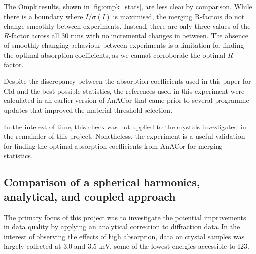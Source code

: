The Ompk results, shown in \cref{fig:ompk_stats}, are less clear by comparison. While there is a boundary where $I/\sigma(I)$ is maximised, the merging R-factors do not change smoothly between experiments. Instead, there are only three values of the $R$-factor across all 30 runs with no incremental changes in between. %
The absence of smoothly-changing behaviour between experiments is a limitation for finding the optimal absorption coefficients, as we cannot corroborate the optimal $R$ factor.%




Despite the discrepancy between the absorption coefficients used in this paper for Cld and the best possible statistics, the references used in this experiment were calculated in an earlier version of AnACor that came prior to several programme updates that improved the material threshold selection.

In the interest of time, this check was not applied to the crystals investigated in the remainder of this project. Nonetheless, the experiment is a useful validation for finding the optimal absorption coefficients from AnACor for merging statistics. %


\subsection{Comparison of a spherical harmonics, analytical, and coupled approach} %
The primary focus of this project was to investigate the potential improvements in data quality by applying an analytical correction to diffraction data.
In the interest of observing the effects of high absorption, data on crystal samples was largely collected at 3.0 and 3.5 \unit{keV}, some of the lowest energies accessible to I23.

